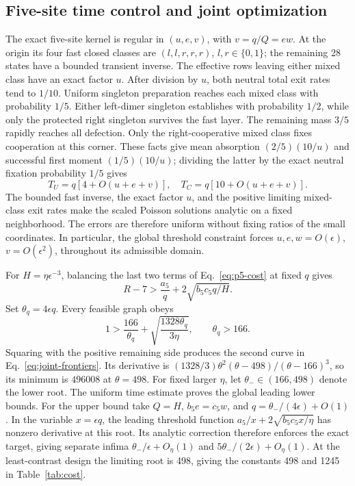 \documentclass[aps,pre,reprint,amsmath,amssymb,longbibliography]{revtex4-2}
\begin{document}
\subsection{Five-site time control and joint optimization}

The exact five-site kernel is regular in \((u,e,v)\), with
\(v=q/Q=ew\). At the origin its four fast closed classes are
\((l,l,r,r,r)\), \(l,r\in\{0,1\}\); the remaining 28 states
have a bounded transient inverse. The effective rows leaving either
mixed class have an exact factor \(u\). After division by \(u\),
both neutral total exit rates tend to \(1/10\).
Uniform singleton preparation reaches each mixed class with probability
\(1/5\). Either left-dimer singleton establishes with probability
\(1/2\), while only the protected right singleton survives the fast
layer. The remaining mass \(3/5\) rapidly reaches all defection.
Only the right-cooperative mixed class fixes cooperation at this corner.
These facts give mean absorption \((2/5)(10/u)\) and successful
first moment \((1/5)(10/u)\); dividing the latter by the exact
neutral fixation probability \(1/5\) gives
\begin{equation}
 T_U=q[4+O(u+e+v)],\quad
 T_C=q[10+O(u+e+v)].
 \label{eq:app-p5-times}
\end{equation}
The bounded fast inverse, the exact factor \(u\), and the positive
limiting mixed-class exit rates make the scaled Poisson solutions
analytic on a fixed neighborhood. The errors are therefore uniform
without fixing ratios of the small coordinates. In particular, the
global threshold constraint forces \(u,e,w=O(\epsilon)\),
\(v=O(\epsilon^2)\), throughout its admissible domain.

For \(H=\eta\epsilon^{-3}\), balancing the last two terms of
Eq.~\eqref{eq:p5-cost} at fixed \(q\) gives
\begin{equation}
 R-7>\frac{a_5}{q}+2\sqrt{b_5c_5q/H}.
 \label{eq:app-p5-fixed-q}
\end{equation}
Set \(\theta_q=4\epsilon q\). Every feasible graph obeys
\begin{equation}
 1>\frac{166}{\theta_q}
       +\sqrt{\frac{1328\theta_q}{3\eta}},\qquad
 \theta_q>166.
 \label{eq:app-p5-feasibility}
\end{equation}
Squaring with the positive remaining side produces the second curve
in Eq.~\eqref{eq:joint-frontiers}. Its derivative is
\((1328/3)\theta^2(\theta-498)/(\theta-166)^3\), so its minimum
is \(496008\) at \(\theta=498\). For fixed larger \(\eta\),
let \(\theta_-\in(166,498)\) denote the lower root. The uniform
time estimate proves the global leading lower bounds. For the upper
bound take \(Q=H\), \(b_5e=c_5w\), and
\(q=\theta_-/(4\epsilon)+O(1)\). In the variable
\(x=\epsilon q\), the leading threshold function
\(a_5/x+2\sqrt{b_5c_5x/\eta}\) has nonzero derivative at this
root. Its analytic correction therefore enforces the exact target,
giving separate infima \(\theta_-/\epsilon+O_\eta(1)\) and
\(5\theta_-/(2\epsilon)+O_\eta(1)\).
At the least-contrast design the limiting root is 498, giving
the constants 498 and 1245 in Table~\ref{tab:cost}.
\end{document}
